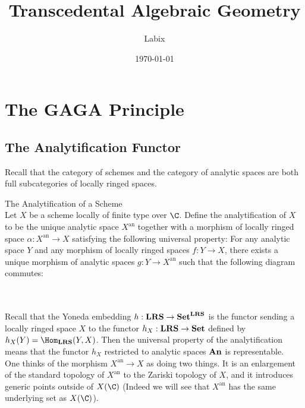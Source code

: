 \documentclass[a4paper]{article}
\title{Transcedental Algebraic Geometry}
\author{Labix}
\date{\today}
\begin{document}
\maketitle
\begin{abstract}
\end{abstract}
\pagebreak
\tableofcontents

\pagebreak
\section{The GAGA Principle}
\subsection{The Analytification Functor}
Recall that the category of schemes and the category of analytic spaces are both full subcategories of locally ringed spaces. 

\begin{defn}{The Analytification of a Scheme}{}\\
Let $X$ be a scheme locally of finite type over $\C$. Define the analytification of $X$ to be the unique analytic space $X^\text{an}$ together with a morphism of locally ringed space $\alpha:X^\text{an}\to X$ satisfying the following universal property: For any analytic space $Y$ and any morphism of locally ringed spaces $f:Y\to X$, there exists a unique morphism of analytic spaces $g:Y\to X^\text{an}$ such that the following diagram commutes: \\~\\
\\
\end{defn}

Recall that the Yoneda embedding $h:\bold{LRS}\to\bold{Set}^{\bold{LRS}}$ is the functor sending a locally ringed space $X$ to the functor $h_X:\bold{LRS}\to\bold{Set}$ defined by $h_X(Y)=\Hom_{\bold{LRS}}(Y,X)$. Then the universal property of the analytification means that the functor $h_X$ restricted to analytic spaces $\bold{An}$ is representable. \\

One thinks of the morphism $X^\text{an}\to X$ as doing two things. It is an enlargement of the standard topology of $X^\text{an}$ to the Zariski topology of $X$, and it introduces generic points outside of $X(\C)$ (Indeed we will see that $X^\text{an}$ has the same underlying set as $X(\C)$). 
\end{document}
